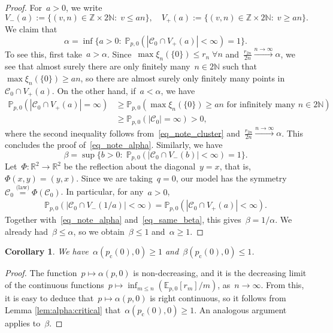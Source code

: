 \documentclass[pdflatex,sn-mathphys-num]{sn-jnl}%
\newcommand{\cC}{\ensuremath{\mathcal C}}
\newcommand{\1}{{\ensuremath{\mathbf{1}}} }
\newcommand{\pc}{\ensuremath{p_{\mathrm{c}} }}
\theoremstyle{thmstyleone}%
\newtheorem{corollary}[theorem]{Corollary}%
\theoremstyle{thmstyletwo}%
\theoremstyle{thmstylethree}%
\begin{document}
\begin{proof}
For~$a > 0$, we write
\[V_-(a):= \{(v,n) \in \mathbb Z \times 2 \mathbb N:\; v \le an\},\quad V_+(a):=\{(v,n) \in \mathbb Z \times 2 \mathbb N:\; v \ge an\}.\]
 We claim that
\begin{equation}
\label{eq_note_alpha}
    \alpha = \inf\{a > 0:\; \mathbb P_{p,0}(|\cC_0 \cap V_+(a)| < \infty) = 1\}.
\end{equation}
To see this, first take~$a > \alpha$. Since~$\max \xi_n(\{0\}) \le r_n \; \forall n$ and~$\frac{r_{2n}}{2n} \xrightarrow{n \to \infty} \alpha$, we see that almost surely there are only finitely many~$n \in 2 \mathbb N$ such that~$\max \xi_n(\{0\}) \ge an$, so there are almost surely only finitely many points in~$\cC_0 \cap V_+(a)$. On the other hand, if~$a < \alpha$, we have
\begin{align*}
\mathbb P_{p,0}(|\cC_0 \cap V_+(a)| = \infty) &\ge \mathbb P_{p,0}(\max \xi_n(\{0\}) \ge an \text{ for infinitely many } n \in 2 \mathbb N) \\
    &\ge \mathbb P_{p,0}(|\cC_0| = \infty) > 0,
\end{align*}
where the second inequality follows from~\eqref{eq_note_cluster} and~$\frac{r_{2n}}{2n} \xrightarrow{n \to \infty} \alpha$. This concludes the proof of~\eqref{eq_note_alpha}. Similarly, we have
\begin{equation}
    \label{eq_same_beta}
\beta = \sup\{b > 0:\; \mathbb P_{p,0}(|\cC_0 \cap V_-(b)| < \infty) = 1\}.
\end{equation}
Let~$\Phi: \mathbb R^2 \to \mathbb R^2$ be the reflection about the diagonal~$y=x$, that is,~$\Phi(x,y) = (y,x)$. Since we are taking~$q = 0$, our model has the symmetry~$\cC_0 \stackrel{\text{(law)}}{=} \Phi(\cC_0)$. In particular, for any~$a > 0$,
	\begin{align*}
		\mathbb P_{p,0}( | \cC_0 \cap V_-(1/a) | < \infty) =\mathbb P_{p,0}( |\cC_0 \cap V_+(a)| < \infty).
	\end{align*}
	Together with~\eqref{eq_note_alpha} and~\eqref{eq_same_beta}, this gives~$\beta = 1/\alpha$. We already had~$\beta \le \alpha$, so we obtain~$\beta \le 1$ and~$\alpha \ge 1$.
\end{proof}

\begin{corollary}\label{cor_at_crit}
	We have~$\alpha(\pc(0),0) \ge 1$ and~$\beta(\pc(0),0) \le 1$.
\end{corollary}
\begin{proof}
The function~$p \mapsto \alpha(p,0)$ is non-decreasing, and it is the decreasing limit of the continuous functions~$p \mapsto \inf_{m \le n} (\mathbb E_{p,0}[r_m]/m)$, as~$n \to \infty$. From this, it is easy to deduce that~$p \mapsto \alpha(p,0)$ is right continuous, so it follows from Lemma \ref{lem:alpha:critical} that~$\alpha(\pc(0),0) \ge 1$. An analogous argument applies to~$\beta$.
\end{proof}
\end{document}
